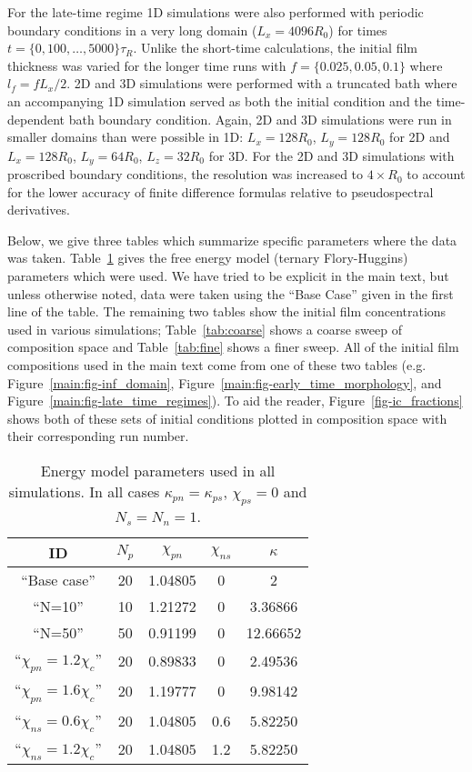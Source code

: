 \documentclass[journal=mamobx,manuscript=suppinfo]{achemso}
\begin{document}
For the late-time regime 1D simulations were also performed with periodic boundary conditions in a very long domain ($L_{x} = 4096 R_{0}$) for times $t  = \{0, 100, \ldots, 5000\} \tau_{R}$.
Unlike the short-time calculations, the initial film thickness was varied for the longer time runs with $f = \{0.025, 0.05, 0.1\}$ where $l_{f} = f L_{x}/2$.
2D and 3D simulations were performed with a truncated bath where an accompanying 1D simulation served as both the initial condition and the time-dependent bath boundary condition.
Again, 2D and 3D simulations were run in smaller domains than were possible in 1D: $L_{x} = 128 R_{0}$, $L_{y} = 128 R_{0}$ for 2D and $L_{x} = 128 R_{0}$, $L_{y} = 64 R_{0}$, $L_{z} = 32 R_{0}$ for 3D.
For the 2D and 3D simulations with proscribed boundary conditions, the resolution was increased to $4\times R_{0}$ to account for the lower accuracy of finite difference formulas relative to pseudospectral derivatives.

Below, we give three tables which summarize specific parameters where the data was taken.
Table~\ref{tab:energy_params} gives the free energy model (ternary Flory-Huggins) parameters which were used.
We have tried to be explicit in the main text, but unless otherwise noted, data were taken using the ``Base Case'' given in the first line of the table.
The remaining two tables show the initial film concentrations used in various simulations;
Table~\ref{tab:coarse} shows a coarse sweep of composition space and Table~\ref{tab:fine} shows a finer sweep.
All of the initial film compositions used in the main text come from one of these two tables (e.g. Figure~\ref{main:fig-inf_domain}, Figure~\ref{main:fig-early_time_morphology}, and Figure~\ref{main:fig-late_time_regimes}).
To aid the reader, Figure~\ref{fig-ic_fractions} shows both of these sets of initial conditions plotted in composition space with their corresponding run number.

\begin{table}
\caption{Energy model parameters used in all simulations. 
In all cases $\kappa_{pn} = \kappa_{ps}$, $\chi_{ps} = 0$ and $N_{s} = N_{n} = 1$.
}
\label{tab:energy_params}
\bgroup
\def\arraystretch{1.3}%
\begin{tabular}{ccccc}
\hline
ID & $N_{p}$ & $\chi_{pn}$ & $\chi_{ns}$ & $\kappa$ \\
\hline
``Base case'' & 20 & 1.04805 & 0 & 2 \\
``N=10'' & 10 & 1.21272 & 0 & 3.36866 \\
``N=50'' & 50 & 0.91199 & 0 & 12.66652 \\ 
``$\chi_{pn} = 1.2 \chi_{c}$'' & 20 & 0.89833 & 0 & 2.49536 \\
``$\chi_{pn} = 1.6 \chi_{c}$'' & 20 & 1.19777 & 0 & 9.98142 \\ 
``$\chi_{ns} = 0.6 \chi_{c}$'' & 20 & 1.04805 & 0.6 & 5.82250 \\
``$\chi_{ns} = 1.2 \chi_{c}$'' & 20 & 1.04805 & 1.2 & 5.82250 \\
\hline
\end{tabular}
\egroup
\end{table}
\end{document}
